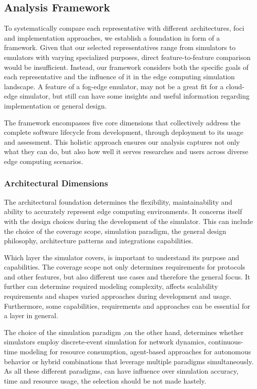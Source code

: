 \subsection{Analysis Framework}
To systematically compare each representative with different architectures, foci and implementation approaches, we establish a foundation in form of a framework.
Given that our selected representatives range from simulators to emulators with varying specialized purposes, direct feature-to-feature comparison would be insufficient.
Instead, our framework considers both the specific goals of each representative and the influence of it in the edge computing simulation landscape.
A feature of a fog-edge emulator, may not be a great fit for a cloud-edge simulator, but still can have some insights and useful information regarding implementation or general design.

The framework encompasses five core dimensions that collectively address the complete software lifecycle from development, through deployment to its usage and assessment.
This holistic approach ensures our analysis captures not only what they can do, but also how well it serves researches and users across diverse edge computing scenarios.

\subsubsection{Architectural Dimensions}
The architectural foundation determines the flexibility, maintainability and ability to accurately represent edge computing environments.
It concerns itself with the design choices during the development of the simulator.
This can include the choice of the coverage scope, simulation paradigm, the general design philosophy, architecture patterns and integrations capabilities.

Which layer the simulator covers, is important to understand its purpose and capabilities. 
The coverage scope not only determines requirements for protocols and other features, but also different use cases and therefore the general focus.
It further can determine required modeling complexity, affects scalability requirements and shapes varied approaches during development and usage.
Furthermore, some capabilities, requirements and approaches can be essential for a layer in general.

The choice of the simulation paradigm ,on the other hand, determines whether simulators employ discrete-event simulation for network dynamics, 
continuous-time modeling for resource consumption, agent-based approaches for autonomous behavior or hybrid combinations that leverage multiple paradigms simultaneously.
As all these different paradigms, can have influence over simulation accuracy, time and resource usage, the selection should be not made hastely.

